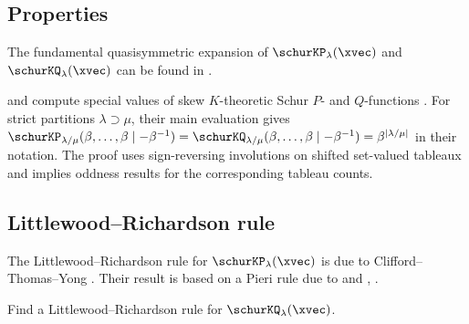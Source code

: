 \subsection[schurKPQProps]{Properties}

The fundamental quasisymmetric expansion of $\schurKP_{\lambda}(\xvec)$
and $\schurKQ_{\lambda}(\xvec)$ can be found in \cite{HamakerKeilthyPatriasWebsterZhangZhou2017}.

 and  compute special values
of skew $K$-theoretic Schur $P$- and $Q$-functions
\cite{NobukawaShimazaki2024x}.  For strict partitions $\lambda \supset \mu$,
their main evaluation gives
$\schurKP_{\lambda/\mu}(\beta,\dotsc,\beta\mid -\beta^{-1})
= \schurKQ_{\lambda/\mu}(\beta,\dotsc,\beta\mid -\beta^{-1})
= \beta^{|\lambda/\mu|}$ in their notation.  The proof uses sign-reversing
involutions on shifted set-valued tableaux and implies oddness results for the
corresponding tableau counts.


\subsection[schurKPQLRRule]{Littlewood--Richardson rule}

The Littlewood--Richardson rule for $\schurKP_{\lambda}(\xvec)$ is due to 
Clifford--Thomas--Yong \cite{CliffordThomasYong2014}.
Their result is based on a Pieri rule due to  and , \cite{BuchRavikumar2012}.

\begin{problem}
Find a Littlewood--Richardson rule for $\schurKQ_{\lambda}(\xvec)$.
\end{problem}
